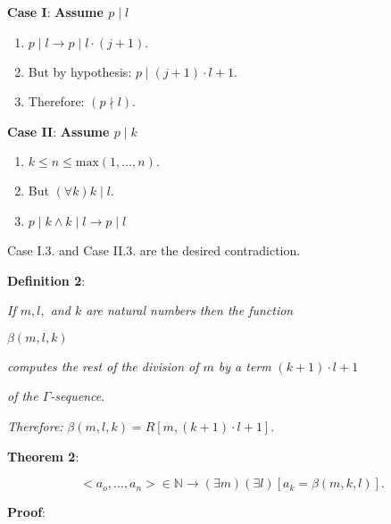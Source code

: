 \documentclass[12pt]{article}
\begin{document}
\textbf{Case I}: \textbf{Assume $ {p}\mid{l}$}

\begin{enumerate}
\item ${p}\mid{l} \rightarrow {p}\mid{l} \cdot (j + 1).$

\item But by hypothesis: $ {p}\mid{(j + 1) \cdot l + 1}.$

\item Therefore: $({p}\nmid{l}).$
\end{enumerate}

\textbf{Case II}: \textbf{Assume $ {p}\mid{k}$} 

\begin{enumerate}
\item $k \le n \le \text{max} (1, \ldots, n).$

\item But $(\forall k) {k}\mid{l}.$

\item $ {p}\mid{k} \wedge {k}\mid{l} \rightarrow  {p}\mid{l}$ 
\end{enumerate}

Case I.3. and Case II.3. are the desired contradiction.

\textbf{Definition 2}:  

\begin{center}
\emph{If $m, l,$ and $k$ are natural numbers then the function}

$\beta (m, l, k)$
 
\emph{computes the rest of the division of $m$ by a term} $(k + 1) \cdot l + 1$

\emph{of the $\Gamma$-sequence}.

\emph{Therefore:} $\beta (m, l, k) = R [m, (k + 1) \cdot l + 1].$ 
\end{center}

\textbf{Theorem 2}:   

$$<a_o, \ldots, a_n> \in \mathbb{N} \rightarrow (\exists m) (\exists l) [a_k = \beta (m, k, l)].$$ 

\textbf{Proof}: 
\end{document}
